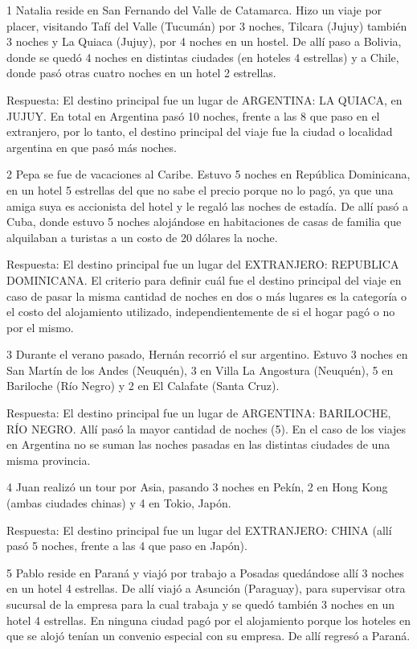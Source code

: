 \documentclass[
  openany]{book}
\begin{document}
1 Natalia reside en San Fernando del Valle de Catamarca. Hizo un viaje por placer, visitando Tafí del Valle (Tucumán) por 3 noches, Tilcara (Jujuy) también 3 noches y La Quiaca (Jujuy), por 4 noches en un hostel. De allí paso a Bolivia, donde se quedó 4 noches en distintas ciudades (en hoteles 4 estrellas) y a Chile, donde pasó otras cuatro noches en un hotel 2 estrellas.

Respuesta: El destino principal fue un lugar de ARGENTINA: LA QUIACA, en JUJUY. En total en Argentina pasó 10 noches, frente a las 8 que paso en el extranjero, por lo tanto, el destino principal del viaje fue la ciudad o localidad argentina en que pasó más noches.

2 Pepa se fue de vacaciones al Caribe. Estuvo 5 noches en República Dominicana, en un hotel 5 estrellas del que no sabe el precio porque no lo pagó, ya que una amiga suya es accionista del hotel y le regaló las noches de estadía. De allí pasó a Cuba, donde estuvo 5 noches alojándose en habitaciones de casas de familia que alquilaban a turistas a un costo de 20 dólares la noche.

Respuesta: El destino principal fue un lugar del EXTRANJERO: REPUBLICA DOMINICANA. El criterio para definir cuál fue el destino principal del viaje en caso de pasar la misma cantidad de noches en dos o más lugares es la categoría o el costo del alojamiento utilizado, independientemente de si el hogar pagó o no por el mismo.

3 Durante el verano pasado, Hernán recorrió el sur argentino. Estuvo 3 noches en San Martín de los Andes (Neuquén), 3 en Villa La Angostura (Neuquén), 5 en Bariloche (Río Negro) y 2 en El Calafate (Santa Cruz).

Respuesta: El destino principal fue un lugar de ARGENTINA: BARILOCHE, RÍO NEGRO. Allí pasó la mayor cantidad de noches (5). En el caso de los viajes en Argentina no se suman las noches pasadas en las distintas ciudades de una misma provincia.

4 Juan realizó un tour por Asia, pasando 3 noches en Pekín, 2 en Hong Kong (ambas ciudades chinas) y 4 en Tokio, Japón.

Respuesta: El destino principal fue un lugar del EXTRANJERO: CHINA (allí pasó 5 noches, frente a las 4 que paso en Japón).

5 Pablo reside en Paraná y viajó por trabajo a Posadas quedándose allí 3 noches en un hotel 4 estrellas. De allí viajó a Asunción (Paraguay), para supervisar otra sucursal de la empresa para la cual trabaja y se quedó también 3 noches en un hotel 4 estrellas. En ninguna ciudad pagó por el alojamiento porque los hoteles en que se alojó tenían un convenio especial con su empresa. De allí regresó a Paraná.
\end{document}
